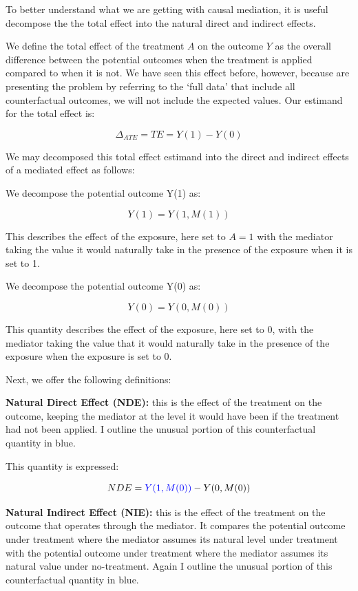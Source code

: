 \documentclass[
  singlecolumn,
  9pt]{article}
\begin{document}
To better understand what we are getting with causal mediation, it is
useful decompose the the total effect into the natural direct and
indirect effects.

We define the total effect of the treatment \(A\) on the outcome \(Y\)
as the overall difference between the potential outcomes when the
treatment is applied compared to when it is not. We have seen this
effect before, however, because are presenting the problem by referring
to the `full data' that include all counterfactual outcomes, we will not
include the expected values. Our estimand for the total effect is:

\[
\Delta_{ATE} = TE = Y(1) - Y(0)
\]

We may decomposed this total effect estimand into the direct and
indirect effects of a mediated effect as follows:

We decompose the potential outcome Y(1) as:

\[ 
Y(1) = Y(1, M(1))
\]

This describes the effect of the exposure, here set to \(A = 1\) with
the mediator taking the value it would naturally take in the presence of
the exposure when it is set to 1.

We decompose the potential outcome Y(0) as:

\[ 
Y(0) = Y(0, M(0))
\]

This quantity describes the effect of the exposure, here set to 0, with
the mediator taking the value that it would naturally take in the
presence of the exposure when the exposure is set to 0.

Next, we offer the following definitions:

\textbf{Natural Direct Effect (NDE):} this is the effect of the
treatment on the outcome, keeping the mediator at the level it would
have been if the treatment had not been applied. I outline the unusual
portion of this counterfactual quantity in blue.

This quantity is expressed:

\[
 NDE = \textcolor{blue}{Y(1, M(0))} - Y(0, M(0))
 \]

\textbf{Natural Indirect Effect (NIE):} this is the effect of the
treatment on the outcome that operates through the mediator. It compares
the potential outcome under treatment where the mediator assumes its
natural level under treatment with the potential outcome under treatment
where the mediator assumes its natural value under no-treatment. Again I
outline the unusual portion of this counterfactual quantity in blue.
\end{document}
